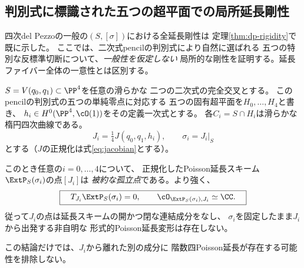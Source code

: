 
\subsection{判別式に標識された五つの超平面での局所延長剛性}
\label{subsec:dp-eigen-hyperplane-rigidity}

四次del Pezzoの一般の$(S,[\sigma])$における全延長剛性は
定理\ref{thm:dp-rigidity}で既に示した。
ここでは、二次式pencilの判別式により自然に選ばれる
五つの特別な反標準切断について、\emph{一般性を仮定しない}
局所的な剛性を証明する。延長ファイバー全体の一意性とは区別する。

\begin{theorem}[判別式の固有超平面切断における被約孤立性]
\label{thm:dp-eigen-hyperplane-local-rigidity}
$S=V(q_0,q_1)\subset\PP^4$を任意の滑らかな
二つの二次式の完全交叉とする。
このpencilの判別式の五つの単純零点に対応する
五つの固有超平面を$H_0,\ldots,H_4$と書き、
$h_i\in H^0(\PP^4,\cO(1))$をその定義一次式とする。
各$C_i=S\cap H_i$は滑らかな楕円四次曲線である。
\[
 J_i=\tfrac14 J(q_0,q_1,h_i),\qquad
 \sigma_i=J_i|_S
\]
とする（$J$の正規化は式\eqref{eq:jacobian}とする）。

このとき任意の$i=0,\ldots,4$について、
正規化したPoisson延長スキーム
$\ExtP_S(\sigma_i)$の点$[J_i]$は
\emph{被約な孤立点}である。より強く、
\[
 \boxed{\quad T_{J_i}\ExtP_S(\sigma_i)=0,\qquad
       \cO_{\ExtP_S(\sigma_i),J_i}\simeq\CC.\quad}
\]
従って$J_i$の点は延長スキームの開かつ閉な連結成分をなし、
$\sigma_i$を固定したまま$J_i$から出発する非自明な
形式的Poisson延長変形は存在しない。

この結論だけでは、$J_i$から離れた別の成分に
階数四Poisson延長が存在する可能性を排除しない。
\end{theorem}
